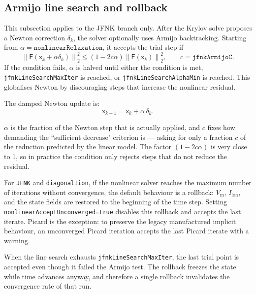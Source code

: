 \documentclass[11pt,a4paper]{article}
\newcommand{\code}[1]{\texttt{\small #1}}
\newcommand{\Vm}{V_{\text{m}}}
\newcommand{\Iion}{I_{\mathrm{ion}}}
\newcommand{\Fres}{\mathsf{F}}
\newcommand{\norm}[1]{\left\lVert #1 \right\rVert}
\begin{document}
\subsection{Armijo line search and rollback}
\label{sec:rollback}

This subsection applies to the JFNK branch only. After the Krylov solve
proposes a Newton correction $\delta_k$, the solver optionally uses Armijo
backtracking. Starting from $\alpha=\texttt{nonlinearRelaxation}$, it
accepts the trial step if
\begin{equation}
  \norm{\Fres(\mathsf{x}_k+\alpha\delta_k)}_2^2
  \le
  \left(1-2c\alpha\right)
  \norm{\Fres(\mathsf{x}_k)}_2^2,
  \qquad c=\texttt{jfnkArmijoC}.
  \label{eq:armijo}
\end{equation}
If the condition fails, $\alpha$ is halved until either the condition is met,
\code{jfnkLineSearchMaxIter} is reached, or
\code{jfnkLineSearchAlphaMin} is reached. This globalises Newton by discouraging
steps that increase the nonlinear residual.

The damped Newton update is:
$$
\mathsf{x}_{k+1}=\mathsf{x}_k+\alpha\,\delta_k.
$$

$\alpha$ is the fraction of the Newton step that is actually applied, and $c$ fixes how demanding the ``sufficient decrease" criterion is --- asking for only a fraction $c$ of the reduction predicted by the linear model. The factor $(1-2c\alpha)$ is very close to 1, so in practice the condition only rejects steps that do not reduce the residual.

For \code{JFNK} and \code{diagonalIion}, if the nonlinear solver reaches the
maximum number of iterations without convergence, the default behaviour is a
rollback: $\Vm$, $\Iion$, and the state fields are restored to the beginning of
the time step. Setting \code{nonlinearAcceptUnconverged=true} disables this
rollback and accepts the last iterate. Picard is the exception: to preserve the
legacy manufactured implicit behaviour, an unconverged Picard iteration accepts
the last Picard iterate with a warning.

When the line search exhausts \code{jfnkLineSearchMaxIter}, the last trial point is accepted even though it failed the Armijo test.  The rollback freezes the state while time advances anyway, and therefore a single rollback invalidates the convergence rate of that run.
\end{document}
